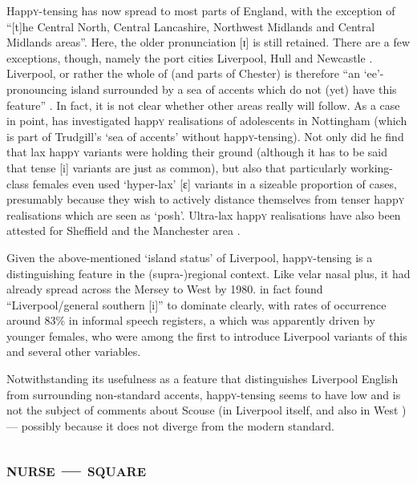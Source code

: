 Happ\textsc{y}-tensing has now spread to most parts of England, with the exception of ``[t]he Central North, Central Lancashire, Northwest Midlands and Central Midlands areas''.
Here, the older pronunciation [ɪ] is still retained.
There are a few exceptions, though, namely the port cities Liverpool, Hull and Newcastle \citep[cf.][62]{trudgill1999}.
Liverpool, or rather the whole of  (and parts of Chester) is therefore ``an `ee'-pronouncing island surrounded by a sea of accents which do not (yet) have this feature'' \citep[72]{trudgill1999}.
In fact, it is not clear whether other areas really will follow.
As a case in point, \textcite{flynn2010} has investigated happ\textsc{y} realisations of adolescents in Nottingham (which is part of Trudgill's `sea of accents' without happ\textsc{y}-tensing).
Not only did he find that lax happ\textsc{y} variants were holding their ground (although it has to be said that tense [i] variants are just as common), but also that particularly working-class females even used `hyper-lax' [ɛ] variants in a sizeable proportion of cases, presumably because they wish to actively distance themselves from tenser happ\textsc{y} realisations which are seen as `posh'.
Ultra-lax happ\textsc{y} realisations have also been attested for Sheffield \parencite{stoddartetal1999} and the Manchester area \parencite{watts2006}.

Given the above-mentioned `island status' of Liverpool, happ\textsc{y}-tensing is a distinguishing feature in the (supra-)regional context.
Like velar nasal plus, it had already spread across the Mersey to West  by 1980.
\textcite[97 and 99]{newbrook1999} in fact found ``Liverpool/general southern [i]'' to dominate clearly, with rates of occurrence around 83\% in informal speech registers, a  which was apparently driven by younger females, who were among the first to introduce Liverpool variants of this and several other variables.

Notwithstanding its usefulness as a feature that distinguishes Liverpool English from surrounding non-standard accents, happ\textsc{y}-tensing seems to have low  and is not the subject of comments about Scouse (in Liverpool itself, and also in West ) --- possibly because it does not diverge from the modern standard.

		\subsection{\textsc{nurse} --- \textsc{square}}\label{sec.var.vow.nurse}

